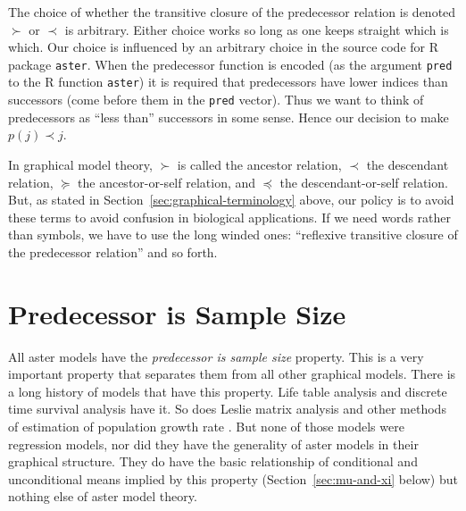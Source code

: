 The choice of whether the transitive closure of the predecessor relation
is denoted $\succ$ or $\prec$ is arbitrary.  Either choice works so long
as one keeps straight which is which.  Our choice is influenced by an
arbitrary choice in the source code for R package \texttt{aster}.  When
the predecessor function is encoded (as the argument \texttt{pred} to the
R function \texttt{aster}) it is required that predecessors have lower indices
than successors (come before them in the \texttt{pred} vector).  Thus we
want to think of predecessors as ``less than'' successors in some sense.
Hence our decision to make $p(j) \prec j$.

In graphical model theory,
$\succ$ is called the ancestor relation,
$\prec$ the descendant relation,
$\succeq$ the ancestor-or-self relation, and
$\preceq$ the descendant-or-self relation.
But, as stated in Section~\ref{sec:graphical-terminology} above,
our policy is to avoid these terms
to avoid confusion in biological applications.
If we need words rather than symbols, we have to use the long winded ones:
``reflexive transitive closure of the predecessor relation'' and so forth.

\section{Predecessor is Sample Size}
\label{sec:piss}

All aster models have the \emph{predecessor is sample size} property.
This is a very important property that separates them from all other
graphical models.  There is a long history of models that have this
property.  Life table analysis and discrete time survival analysis have it.
So does Leslie matrix analysis \citep{caswell} and other methods
of estimation of population growth rate \citep{fisher,goodman,lenski-service}.
But none of those models were regression models, nor did they have
the generality of aster models in their graphical structure.
They do have the basic relationship of conditional and unconditional means
implied by this property (Section~\ref{sec:mu-and-xi} below)
but nothing else of aster model theory.

